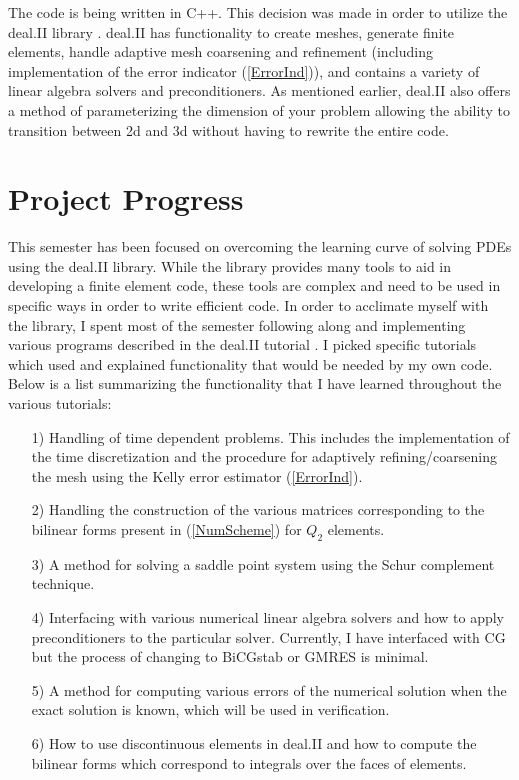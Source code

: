 \documentclass[11pt,fullpage]{article}
\theoremstyle{lemma}
\theoremstyle{definition}
\theoremstyle{lemma}
\begin{document}
The code is being written in C++. This decision was made in order to utilize the deal.II library \cite{AdaptiveMesh:1,DealII}. deal.II has functionality to create meshes, generate finite elements, handle adaptive mesh coarsening and refinement (including implementation of the error indicator (\ref{ErrorInd})), and contains a variety of linear algebra solvers and preconditioners. As mentioned earlier, deal.II also offers a method of parameterizing the dimension of your problem allowing the ability to transition between 2d and 3d without having to rewrite the entire code.

\section{Project Progress}
This semester has been focused on overcoming the learning curve of solving PDEs using the deal.II library. While the library provides many tools to aid in developing a finite element code, these tools are complex and need to be used in specific ways in order to write efficient code. In order to acclimate myself with the library, I spent most of the semester following along and implementing various programs described in the deal.II tutorial \cite{DealIITut}. I picked specific tutorials which used and explained functionality that would be needed by my own code. Below is a list summarizing the functionality that I have learned throughout the various tutorials:
\begin{itemize}
	\item[1)] Handling of time dependent problems. This includes the implementation of the time discretization and the procedure for adaptively refining/coarsening the mesh using the Kelly error estimator (\ref{ErrorInd}).
	
	\item[2)] Handling the construction of the various matrices corresponding to the bilinear forms present in (\ref{NumScheme}) for $Q_2$ elements.
	
	\item[3)] A method for solving a saddle point system using the Schur complement technique.
	
	\item[4)] Interfacing with various numerical linear algebra solvers and how to apply preconditioners to the particular solver. Currently, I have interfaced with CG but the process of changing to BiCGstab or GMRES is minimal.
	
	\item[5)] A method for computing various errors of the numerical solution when the exact solution is known, which will be used in verification.
	
	\item[6)] How to use discontinuous elements in deal.II and how to compute the bilinear forms which correspond to integrals over the faces of elements.
\end{itemize}
\end{document}
